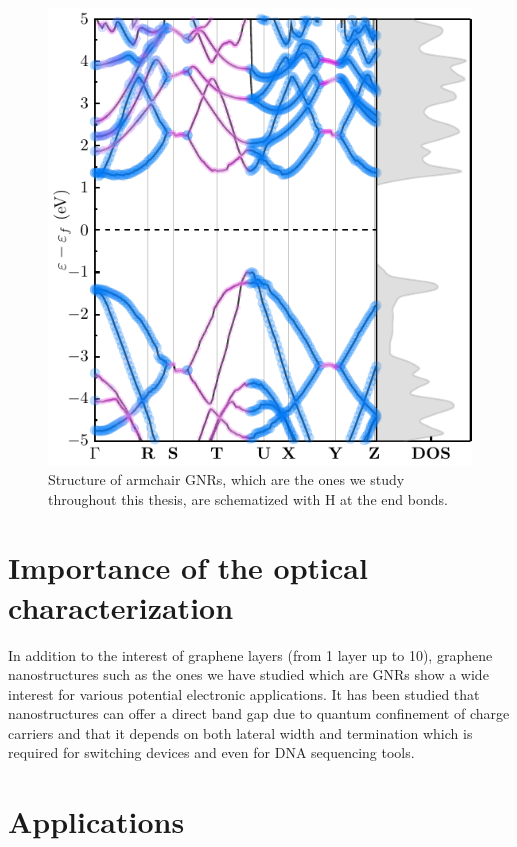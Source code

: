 \begin{figure}[h!]
	\centering
	\includegraphics[width=0.80\linewidth]{FIGURES/Physical_Background/PLOT-GNRS008}
	\caption{Structure of armchair GNRs, which are the ones we study throughout this thesis, are schematized with H at the end bonds. }
	\label{fig:introfig32}
\end{figure}





\section{Importance of the optical characterization}
\vspace{-1cm}
In addition to the interest of graphene layers (from 1 layer up to 10), graphene nanostructures such as the ones we have studied which are GNRs show a wide interest for various potential electronic applications. It has been studied that nanostructures can offer a direct band gap due to quantum confinement of charge carriers and that it depends on both lateral width and termination which is required for switching devices and even for DNA sequencing tools. 



\section{Applications}

